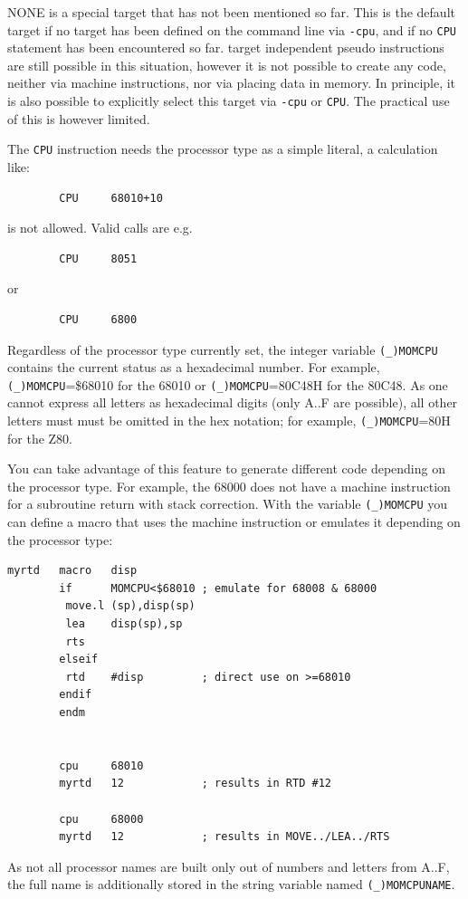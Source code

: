 \documentclass[12pt,twoside]{report}
\newcommand{\tty}[1]{{\tt #1}}
\newcommand{\predefsym}[1]{{\tt (\_)#1}}
\begin{document}
NONE is a special target that has not been mentioned so far.  This is the
default target if no target has been defined on the command line via
{\tt -cpu}, and if no {\tt CPU} statement has been encountered so far.
target independent pseudo instructions are still possible in this situation,
however it is not possible to create any code, neither via machine
instructions, nor via placing data in memory.  In principle, it is
also possible to explicitly select this target via {\tt -cpu} or
{\tt CPU}.  The practical use of this is however limited.

The \tty{CPU} instruction needs the processor type as a simple literal, a
calculation like:
\begin{verbatim}
        CPU     68010+10
\end{verbatim}
is not allowed.  Valid calls are e.g.
\begin{verbatim}
        CPU     8051
\end{verbatim}
or
\begin{verbatim}
        CPU     6800
\end{verbatim}
Regardless of the processor type currently set, the integer variable
\predefsym{MOMCPU} contains the current status as a hexadecimal number.  For
example, \predefsym{MOMCPU}=\$68010 for the 68010 or \predefsym{MOMCPU}=80C48H for the
80C48.  As one cannot express all letters as hexadecimal digits (only A..F
are possible), all other letters must must be omitted in the hex notation;
for example, \predefsym{MOMCPU}=80H for the Z80.

You can take advantage of this feature to generate different code
depending on the processor type.  For example, the 68000 does not have a
machine instruction for a subroutine return with stack correction.  With
the variable \predefsym{MOMCPU} you can define a macro that uses the machine
instruction or emulates it depending on the processor type:
\begin{verbatim}
myrtd   macro   disp
        if      MOMCPU<$68010 ; emulate for 68008 & 68000
         move.l (sp),disp(sp)
         lea    disp(sp),sp
         rts
        elseif
         rtd    #disp         ; direct use on >=68010
        endif
        endm


        cpu     68010
        myrtd   12            ; results in RTD #12

        cpu     68000
        myrtd   12            ; results in MOVE../LEA../RTS
\end{verbatim}
As not all processor names are built only out of numbers and letters
from A..F, the full name is additionally stored in the string
variable named \predefsym{MOMCPUNAME}.
\end{document}
